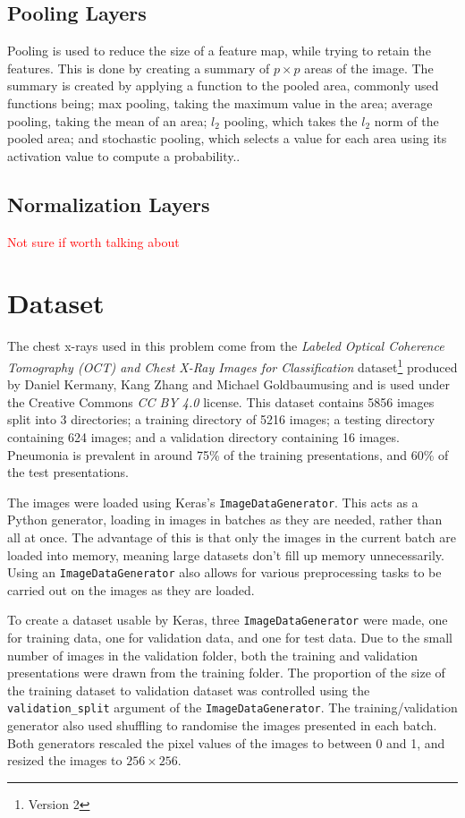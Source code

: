 \documentclass[12pt,a4paper,titlepage,twoside]{report}
\newcommand\todo[1]{\textcolor{red}{#1}}
\begin{document}
	\subsection{Pooling Layers}
	Pooling is used to reduce the size of a feature map, while trying to retain the features. This is done by creating a summary of $p \times p$ areas of the image. The summary is created by applying a function to the pooled area, commonly used functions being; max pooling, taking the maximum value in the area; average pooling, taking the mean of an area; $l_2$ pooling, which takes the $l_2$ norm of the pooled area; and stochastic pooling, which selects a value for each area using its activation value to compute a probability.\cite{cnn-analysis}.
	
	\subsection{Normalization Layers}
	\todo{Not sure if worth talking about}

\section{Dataset}
	The chest x-rays used in this problem come from the \textit{Labeled Optical Coherence Tomography (OCT) and Chest X-Ray Images for Classification} dataset\cite{pne-dataset}\footnote{Version 2} produced by Daniel Kermany, Kang Zhang and Michael Goldbaumusing and is used under the Creative Commons \textit{CC BY 4.0} license. This dataset contains 5856 images split into 3 directories; a training directory of 5216 images; a testing directory containing 624 images; and a validation directory containing 16 images. Pneumonia is prevalent in around 75\% of the training presentations, and 60\% of the test presentations. \par
	The images were loaded using Keras's \texttt{ImageDataGenerator}. This acts as a Python generator, loading in images in batches as they are needed, rather than all at once. The advantage of this is that only the images in the current batch are loaded into memory, meaning large datasets don't fill up memory unnecessarily. Using an \texttt{ImageDataGenerator} also allows for various preprocessing tasks to be carried out on the images as they are loaded. \par 
	To create a dataset usable by Keras, three \texttt{ImageDataGenerator} were made, one for training data, one for validation data, and one for test data. Due to the small number of images in the validation folder, both the training and validation presentations were drawn from the training folder. The proportion of the size of the training dataset to validation dataset was controlled using the \texttt{validation_split} argument of the \texttt{ImageDataGenerator}. The training/validation generator also used shuffling to randomise the images presented in each batch. Both generators rescaled the pixel values of the images to between 0 and 1, and resized the images to $256\times256$.
	
\end{document}

